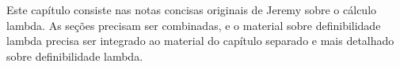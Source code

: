 \documentclass[../../../include/open-logic-chapter]{subfiles}
\begin{document}

\begin{editorial}
Este capítulo consiste nas notas concisas originais de Jeremy sobre o
cálculo lambda. As seções precisam ser combinadas, e o material sobre
definibilidade lambda precisa ser integrado ao material do capítulo
separado e mais detalhado sobre definibilidade lambda.
\end{editorial}














\OLEndChapterHook
\end{document}
